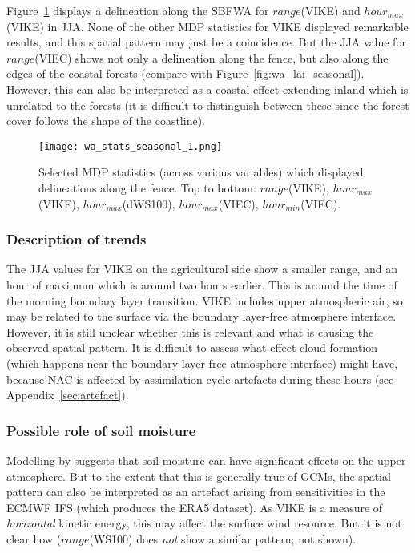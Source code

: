 Figure~\ref{fig:wa_stats_seasonal_1} displays a delineation along the \ac{SBFWA} for $range$(\acs{VIKE}) and $hour_{max}$(\acs{VIKE}) in \ac{JJA}. None of the other \ac{MDP} statistics for \ac{VIKE} displayed remarkable results, and this spatial pattern may just be a coincidence. But the \ac{JJA} value for $range$(\acs{VIEC}) shows not only a delineation along the fence, but also along the edges of the coastal forests (compare with Figure~\ref{fig:wa_lai_seasonal}). However, this can also be interpreted as a coastal effect extending inland which is unrelated to the forests (it is difficult to distinguish between these since the forest cover follows the shape of the coastline).

\begin{figure}[!htp]
	\centering
	\texttt{[image: wa\_stats\_seasonal\_1.png]}
	\caption[Selected MDP statistics with fence delineations]{Selected \ac{MDP} statistics (across various variables) which displayed delineations along the fence. Top to bottom: $range$(\acs{VIKE}), $hour_{max}$(\acs{VIKE}), $hour_{max}$(\acs{dWS100}), $hour_{max}$(\acs{VIEC}), $hour_{min}$(\acs{VIEC}).}
	\label{fig:wa_stats_seasonal_1}
\end{figure}

\subsubsection{Description of trends}

The \ac{JJA} values for \ac{VIKE} on the agricultural side show a smaller range, and an hour of maximum which is around two hours earlier. This is around the time of the morning boundary layer transition. \ac{VIKE} includes upper atmospheric air, so may be related to the surface via the boundary layer-free atmosphere interface. However, it is still unclear whether this is relevant and what is causing the observed spatial pattern. It is difficult to assess what effect cloud formation (which happens near the boundary layer-free atmosphere interface) might have, because \ac{NAC} is affected by assimilation cycle artefacts during these hours (see Appendix~\ref{sec:artefact}).

\subsubsection{Possible role of soil moisture}

Modelling by \citet{martius2021} suggests that soil moisture can have significant effects on the upper atmosphere. But to the extent that this is generally true of \acp{GCM}, the spatial pattern can also be interpreted as an artefact arising from sensitivities in the \ac{ECMWF} \ac{IFS} (which produces the \ac{ERA5} dataset). As \ac{VIKE} is a measure of \textit{horizontal} kinetic energy, this may affect the surface wind resource. But it is not clear how ($range$(\acs{WS100}) does \textit{not} show a similar pattern; not shown).

